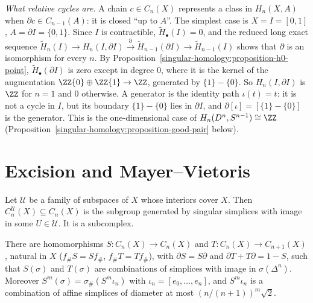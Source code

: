 \begin{example}\label{singular-homology:example-interval}
\emph{What relative cycles are.} A chain $c \in C_n(X)$ represents a class in $H_n(X, A)$ when $\partial c \in C_{n-1}(A)$: it is closed ``up to $A$''. The simplest case is
$X = I = [0, 1]$, $A = \partial I = \{0, 1\}$. Since $I$ is contractible, $\tilde{H}_\bullet(I) = 0$, and the reduced long exact sequence
$\tilde{H}_n(I) \to H_n(I, \partial I) \xrightarrow{\partial} \tilde{H}_{n-1}(\partial I) \to \tilde{H}_{n-1}(I)$ shows that $\partial$ is an isomorphism for every $n$. By
Proposition~\ref{singular-homology:proposition-h0-point}, $\tilde{H}_\bullet(\partial I)$ is zero except in degree $0$, where it is the kernel of the augmentation
$\ZZ\{0\} \oplus \ZZ\{1\} \to \ZZ$, generated by $\{1\} - \{0\}$. So $H_n(I, \partial I)$ is $\ZZ$ for $n = 1$ and $0$ otherwise. A generator is the identity path
$\iota(t) = t$: it is not a cycle in $I$, but its boundary $\{1\} - \{0\}$ lies in $\partial I$, and $\partial[\iota] = [\{1\} - \{0\}]$ is the generator. This is the
one-dimensional case of $H_n(D^n, S^{n-1}) \cong \ZZ$ (Proposition~\ref{singular-homology:proposition-good-pair} below).
\end{example}

\section{Excision and Mayer--Vietoris}\label{singular-homology:section-excision}

\begin{definition}\label{singular-homology:definition-small-chains}
Let $\mathcal{U}$ be a family of subspaces of $X$ whose interiors cover $X$. Then $C^{\mathcal{U}}_n(X) \subseteq C_n(X)$ is the subgroup generated by singular
simplices with image in some $U \in \mathcal{U}$. It is a subcomplex.
\end{definition}

\begin{lemma}\label{singular-homology:lemma-subdivision}
There are homomorphisms $S \colon C_n(X) \to C_n(X)$ and $T \colon C_n(X) \to C_{n+1}(X)$, natural in $X$ ($f_\#S = Sf_\#$, $f_\#T = Tf_\#$), with
$\partial S = S\partial$ and $\partial T + T\partial = 1 - S$, such that $S(\sigma)$ and $T(\sigma)$ are combinations of simplices with image in $\sigma(\Delta^n)$.
Moreover $S^m(\sigma) = \sigma_\#(S^m\iota_n)$ with $\iota_n = [e_0, \ldots, e_n]$, and $S^m\iota_n$ is a combination of affine simplices of diameter at most
$(n/(n+1))^m\sqrt{2}$.
\end{lemma}

